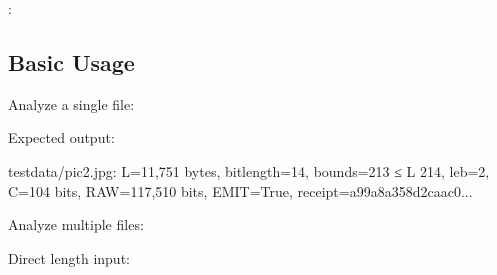 \documentclass[letterpaper,10pt,english]{sphinxmanual}
\begin{document}
\sphinxAtStartPar
{}:

\begin{sphinxVerbatim}[commandchars=\\\{\}]
  
  
\end{sphinxVerbatim}


\subsection{Basic Usage}
\label{\detokenize{quickstart:basic-usage}}
\sphinxAtStartPar
{}

\sphinxAtStartPar
Analyze a single file:

\begin{sphinxVerbatim}[commandchars=\\\{\}]
  
\end{sphinxVerbatim}

\sphinxAtStartPar
Expected output:

\begin{sphinxVerbatim}[commandchars=\\\{\}]
test\PYGZus{}data/pic2.jpg: L=11,751 bytes, bit\PYGZus{}length=14, bounds=2\PYGZca{}13 ≤ L \PYGZlt{} 2\PYGZca{}14,
leb=2, C=104 bits, RAW=117,510 bits, EMIT=True, receipt=a99a8a358d2caac0...
\end{sphinxVerbatim}

\sphinxAtStartPar
Analyze multiple files:

\begin{sphinxVerbatim}[commandchars=\\\{\}]
    
\end{sphinxVerbatim}

\sphinxAtStartPar
Direct length input:

\begin{sphinxVerbatim}[commandchars=\\\{\}]
   
\end{sphinxVerbatim}
\end{document}
